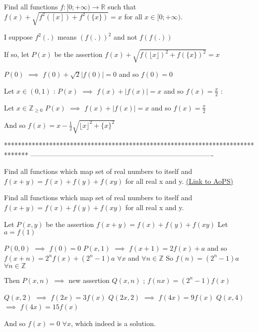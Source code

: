 \begin{solution}
	\begin{tcolorbox}Find all functions ${f: \mathbb[0;+\infty)}\to\mathbb{R}$ such that $f(x)+\sqrt{f^2([ x ])+f^2(\{ x\})}=x$ for all $x{\in}[0;+\infty)$.\end{tcolorbox}
I suppose $f^2(.)$ means $(f(.))^2$ and not $f(f(.))$

If so, let $P(x)$ be the assertion $f(x)+\sqrt{f(\lfloor x\rfloor)^2+f(\{x\})^2}=x$

$P(0)$ $\implies$ $f(0)+\sqrt 2|f(0)|=0$ and so $f(0)=0$

Let $x\in(0,1)$ : $P(x)$ $\implies$ $f(x)+|f(x)|=x$ and so $f(x)=\frac x2$ : 

Let $x\in\mathbb Z_{\ge 0}$ $P(x)$ $\implies$ $f(x)+|f(x)|=x$ and so $f(x)=\frac x2$

And so $\boxed{f(x)=x-\frac 12\sqrt{\lfloor x\rfloor^2+\{x\}^2}}$
\end{solution}
*******************************************************************************
-------------------------------------------------------------------------------

\begin{problem}
	Find all functions which map set of real numbers to itself and $ f(x+y)=f(x)+f(y)+f(xy) $ for all real x and y.
	\flushright \href{https://artofproblemsolving.com/community/c6h573472}{(Link to AoPS)}
\end{problem}



\begin{solution}
	\begin{tcolorbox}Find all functions which map set of real numbers to itself and $ f(x+y)=f(x)+f(y)+f(xy) $ for all real x and y.\end{tcolorbox}
Let $P(x,y)$ be the assertion $f(x+y)=f(x)+f(y)+f(xy)$
Let $a=f(1)$

$P(0,0)$ $\implies$ $f(0)=0$
$P(x,1)$ $\implies$ $f(x+1)=2f(x)+a$ and so $f(x+n)=2^nf(x)+(2^n-1)a$ $\forall x$ and $\forall n\in\mathbb Z$
So $f(n)=(2^n-1)a$ $\forall n\in\mathbb Z$

Then $P(x,n)$ $\implies$ new assertion $Q(x,n)$ ; $f(nx)=(2^n-1)f(x)$

$Q(x,2)$ $\implies$ $f(2x)=3f(x)$
$Q(2x,2)$ $\implies$ $f(4x)=9f(x)$
$Q(x,4)$ $\implies$ $f(4x)=15f(x)$

And so $\boxed{f(x)=0}$ $\forall x$, which indeed is a solution.
\end{solution}



